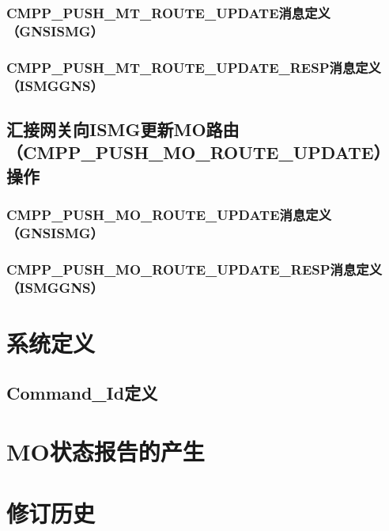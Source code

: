 \documentclass[11pt]{book} %
\begin{document}
\subsubsection{CMPP\_PUSH\_MT\_ROUTE\_UPDATE消息定义（GNS\textrightarrow ISMG）}
\subsubsection{CMPP\_PUSH\_MT\_ROUTE\_UPDATE\_RESP消息定义（ISMG\textrightarrow GNS）}
\subsection{汇接网关向ISMG更新MO路由（CMPP\_PUSH\_MO\_ROUTE\_UPDATE）操作}
\subsubsection{CMPP\_PUSH\_MO\_ROUTE\_UPDATE消息定义（GNS\textrightarrow ISMG）}
\subsubsection{CMPP\_PUSH\_MO\_ROUTE\_UPDATE\_RESP消息定义（ISMG\textrightarrow GNS）}
\section{系统定义}
\subsection{Command\_Id定义}
\section{MO状态报告的产生}
\section{修订历史}
\end{document}
